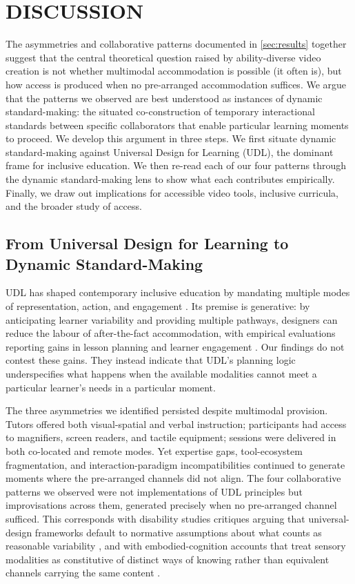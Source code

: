 \section{DISCUSSION}

The asymmetries and collaborative patterns documented in \autoref{sec:results} together suggest that the central theoretical question raised by ability-diverse video creation is not whether multimodal accommodation is possible (it often is), but how access is produced when no pre-arranged accommodation suffices. We argue that the patterns we observed are best understood as instances of dynamic standard-making: the situated co-construction of temporary interactional standards between specific collaborators that enable particular learning moments to proceed. We develop this argument in three steps. We first situate dynamic standard-making against Universal Design for Learning (UDL), the dominant frame for inclusive education. We then re-read each of our four patterns through the dynamic standard-making lens to show what each contributes empirically. Finally, we draw out implications for accessible video tools, inclusive curricula, and the broader study of access.

\subsection{From Universal Design for Learning to Dynamic Standard-Making}

UDL has shaped contemporary inclusive education by mandating multiple modes of representation, action, and engagement \cite{rose_universal_2001,inc_udl_2024}. Its premise is generative: by anticipating learner variability and providing multiple pathways, designers can reduce the labour of after-the-fact accommodation, with empirical evaluations reporting gains in lesson planning and learner engagement \cite{courey_improved_2013,rao_using_2016}. Our findings do not contest these gains. They instead indicate that UDL's planning logic underspecifies what happens when the available modalities cannot meet a particular learner's needs in a particular moment.

The three asymmetries we identified persisted despite multimodal provision. Tutors offered both visual-spatial and verbal instruction; participants had access to magnifiers, screen readers, and tactile equipment; sessions were delivered in both co-located and remote modes. Yet expertise gaps, tool-ecosystem fragmentation, and interaction-paradigm incompatibilities continued to generate moments where the pre-arranged channels did not align. The four collaborative patterns we observed were not implementations of UDL principles but improvisations across them, generated precisely when no pre-arranged channel sufficed. This corresponds with disability studies critiques arguing that universal-design frameworks default to normative assumptions about what counts as reasonable variability \cite{dolmage_academic_2017,hamraie_building_2017}, and with embodied-cognition accounts that treat sensory modalities as constitutive of distinct ways of knowing rather than equivalent channels carrying the same content \cite{varela_embodied_1991,wilson_six_2002}.

